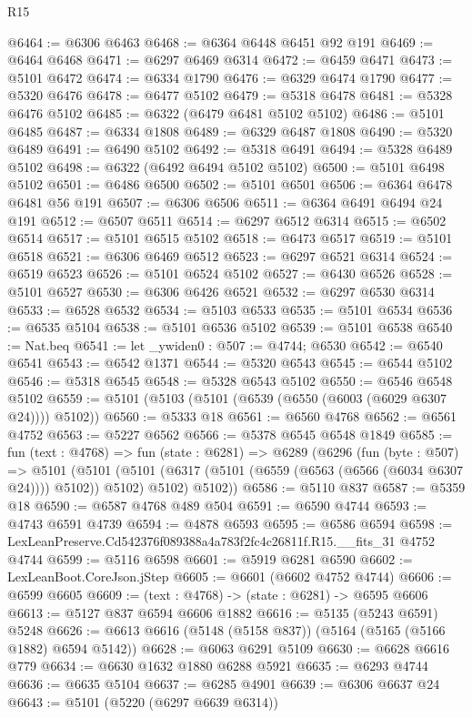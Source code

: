 \begin{lexlean}{R15}
\begin{coremodule}
{{{{{{{{{{{@6464 := @6306 @6463
@6468 := @6364 @6448 @6451 @92 @191
@6469 := @6464 @6468
@6471 := @6297 @6469 @6314
@6472 := @6459 @6471
@6473 := @5101 @6472
@6474 := @6334 @1790
@6476 := @6329 @6474 @1790
@6477 := @5320 @6476
@6478 := @6477 @5102
@6479 := @5318 @6478
@6481 := @5328 @6476 @5102
@6485 := @6322 (@6479 @6481 @5102 @5102)
@6486 := @5101 @6485
@6487 := @6334 @1808
@6489 := @6329 @6487 @1808
@6490 := @5320 @6489
@6491 := @6490 @5102
@6492 := @5318 @6491
@6494 := @5328 @6489 @5102
@6498 := @6322 (@6492 @6494 @5102 @5102)
@6500 := @5101 @6498 @5102
@6501 := @6486 @6500
@6502 := @5101 @6501
@6506 := @6364 @6478 @6481 @56 @191
@6507 := @6306 @6506
@6511 := @6364 @6491 @6494 @24 @191
@6512 := @6507 @6511
@6514 := @6297 @6512 @6314
@6515 := @6502 @6514
@6517 := @5101 @6515 @5102
@6518 := @6473 @6517
@6519 := @5101 @6518
@6521 := @6306 @6469 @6512
@6523 := @6297 @6521 @6314
@6524 := @6519 @6523
@6526 := @5101 @6524 @5102
@6527 := @6430 @6526
@6528 := @5101 @6527
@6530 := @6306 @6426 @6521
@6532 := @6297 @6530 @6314
@6533 := @6528 @6532
@6534 := @5103 @6533
@6535 := @5101 @6534
@6536 := @6535 @5104
@6538 := @5101 @6536 @5102
@6539 := @5101 @6538
@6540 := Nat.beq
@6541 := let _ywiden0 : @507 := @4744; @6530
@6542 := @6540 @6541
@6543 := @6542 @1371
@6544 := @5320 @6543
@6545 := @6544 @5102
@6546 := @5318 @6545
@6548 := @5328 @6543 @5102
@6550 := @6546 @6548 @5102
@6559 := @5101 (@5103 (@5101 (@6539 (@6550 (@6003 (@6029 @6307 @24)))) @5102))
@6560 := @5333 @18
@6561 := @6560 @4768
@6562 := @6561 @4752
@6563 := @5227 @6562
@6566 := @5378 @6545 @6548 @1849
@6585 := fun (text : @4768) =>
  fun (state : @6281) =>
  @6289
    (@6296
      (fun (byte : @507) =>
      @5101
        (@5101 (@5101 (@6317 (@5101 (@6559 (@6563 (@6566 (@6034 @6307 @24)))) @5102)) @5102) @5102)
        @5102))
@6586 := @5110 @837
@6587 := @5359 @18
@6590 := @6587 @4768 @489 @504
@6591 := @6590 @4744
@6593 := @4743 @6591 @4739
@6594 := @4878 @6593
@6595 := @6586 @6594
@6598 := LexLeanPreserve.Cd542376f089388a4a783f2fc4c26811f.R15.__fits_31 @4752 @4744
@6599 := @5116 @6598
@6601 := @5919 @6281 @6590
@6602 := LexLeanBoot.CoreJson.jStep
@6605 := @6601 (@6602 @4752 @4744)
@6606 := @6599 @6605
@6609 := (text : @4768) -> (state : @6281) -> @6595 @6606
@6613 := @5127 @837 @6594 @6606 @1882
@6616 := @5135 (@5243 @6591) @5248
@6626 := @6613 @6616 (@5148 (@5158 @837)) (@5164 (@5165 (@5166 @1882) @6594 @5142))
@6628 := @6063 @6291 @5109
@6630 := @6628 @6616 @779
@6634 := @6630 @1632 @1880 @6288 @5921
@6635 := @6293 @4744
@6636 := @6635 @5104
@6637 := @6285 @4901
@6639 := @6306 @6637 @24
@6643 := @5101 (@5220 (@6297 @6639 @6314))
}}}}}}}}}}}
\end{coremodule}
\end{lexlean}
